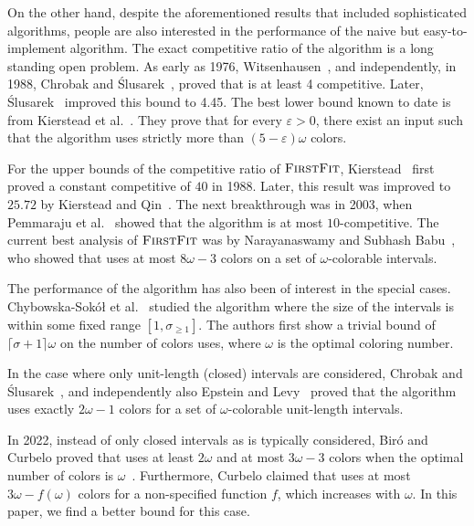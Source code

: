 On the other hand, despite the aforementioned results that included sophisticated algorithms, people are also interested in the performance of the naive but easy-to-implement \ff{} algorithm.
The exact competitive ratio of the \ff{} algorithm is a long standing open problem.
As early as 1976, Witsenhausen~\cite{DBLP:journals/jct/Witsenhausen76}, and independently, in 1988, Chrobak and \'{S}lusarek~\cite{DBLP:journals/ita/ChrobakS88}, proved that \ff{} is at least 4 competitive.
Later, \'{S}lusarek~\cite{DBLP:conf/mfcs/Slusarek89} improved this bound to 4.45.
The best lower bound known to date is from Kierstead et al.~\cite{DBLP:journals/ejc/KiersteadST16}.
They prove that for every $\varepsilon > 0$, there exist an input such that the \ff{} algorithm uses strictly more than $(5 - \varepsilon)\omega$ colors.

For the upper bounds of the competitive ratio of $\textsc{FirstFit}$, Kierstead~\cite{DBLP:journals/siamdm/Kierstead88} first proved a constant competitive of $40$ in 1988.
Later, this result was improved to $25.72$ by Kierstead and Qin~\cite{DBLP:journals/dm/KiersteadQ95}.
The next breakthrough was in 2003, when Pemmaraju et al.~\cite{DBLP:journals/talg/PemmarajuRV11} showed that the \ff{} algorithm is at most $10$-competitive.
The current best analysis of $\textsc{FirstFit}$ was by Narayanaswamy and Subhash Babu~\cite{DBLP:journals/order/NarayanaswamyB08}, who showed that \ff{} uses at most $8\omega - 3$ colors on a set of $\omega$-colorable intervals.

The performance of the \ff{} algorithm has also been of interest in the special cases.
Chybowska-Sok\'{o}\l{} et al.~\cite{DBLP:journals/ejc/ChybowskaSokol24} studied the \ff{} algorithm where the size of the intervals is within some fixed range $[1, \sigma_{\geq 1}]$.
The authors first show a trivial bound of $\lceil \sigma + 1 \rceil\omega$ on the number of colors \ff uses, where $\omega$ is the optimal coloring number.

In the case where only unit-length (closed) intervals are considered, Chrobak and \'{S}lusarek~\cite{DBLP:journals/ita/ChrobakS88}, and independently also Epstein and Levy~\cite{DBLP:conf/icalp/EpsteinL05} proved that the \ff{} algorithm uses exactly $2\omega - 1$ colors for a set of $\omega$-colorable unit-length intervals.

In 2022, instead of only closed intervals as is typically considered, Bir\'{o} and Curbelo proved that \ff{} uses at least $2\omega$ and at most $3\omega - 3$ colors when the optimal number of colors is $\omega$~\cite[Theorem 6.0.1]{Curbelo}.
Furthermore, Curbelo claimed that \ff{} uses at most $3\omega - f(\omega)$ colors for a non-specified function $f$, which increases with $\omega$.
In this paper, we find a better bound for this case.

